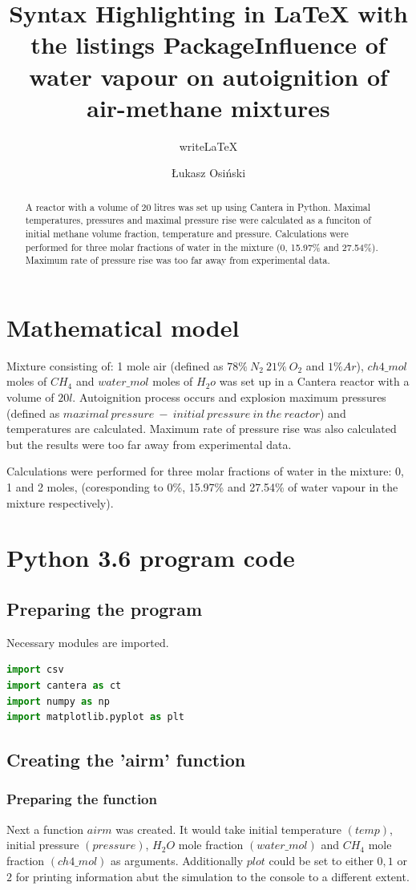 \documentclass[a4paper]{article}
\title{Syntax Highlighting in LaTeX with the listings Package}
\author{writeLaTeX}
\title{Influence of water vapour on autoignition of air-methane mixtures}
\author{Łukasz Osiński}
\begin{document}
\maketitle

\begin{abstract}
A reactor with a volume of 20 litres was set up using Cantera in Python. Maximal temperatures, pressures and maximal pressure rise were calculated as a funciton of initial methane volume fraction, temperature and pressure. Calculations were performed for three molar fractions of water in the mixture (0, 15.97\% and 27.54\%). Maximum rate of pressure rise was too far away from experimental data.
\end{abstract}

\section{Mathematical model}
Mixture consisting of: 1 mole air (defined as $78\%\ N_2\ 21\%\ O_2$ and $1\%Ar$), $ch4\_mol$ moles of $CH_4$ and $water\_mol$ moles of $H_2o$ was set up in a Cantera reactor with a volume of $20 l$. Autoignition process occurs and explosion maximum pressures (defined as $maximal\ pressure\ -\ initial\ pressure\ in\ the\ reactor$) and temperatures are calculated. Maximum rate of pressure rise was also calculated but the results were too far away from experimental data.

Calculations were performed for three molar fractions of water in the mixture: 0, 1 and 2 moles, (coresponding to 0\%, 15.97\% and 27.54\% of water vapour in the mixture respectively).

\section{Python 3.6 program code}
\subsection{Preparing the program}
Necessary modules are imported.
\begin{lstlisting}[language=python]
import csv
import cantera as ct
import numpy as np
import matplotlib.pyplot as plt
\end{lstlisting}
\subsection{Creating the 'airm' function}
\subsubsection{Preparing the function}
Next a function $airm$ was created. It would take initial temperature $(temp)$, initial pressure $(pressure)$, $H_2O$ mole fraction $(water\_mol)$ and $CH_4$ mole fraction $(ch4\_mol)$ as arguments. Additionally $plot$ could be set to either $0, 1$ or $2$ for printing information abut the simulation to the console to a different extent. 
\end{document}
